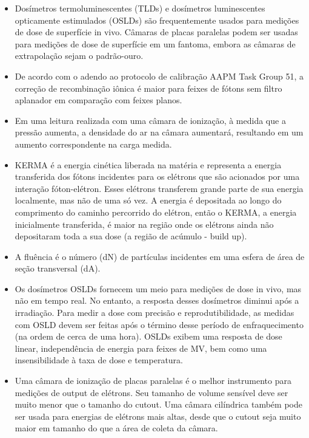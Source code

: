 \documentclass[11pt,a4paper]{article}
\newcounter{exemplo}
\begin{document}
\begin{exemplo}[Dosimetria]
\begin{itemize}
        \item Dosímetros termoluminescentes (TLDs) e dosímetros luminescentes opticamente estimulados (OSLDs) são frequentemente usados para medições de dose de superfície in vivo. Câmaras de placas paralelas podem ser usadas para medições de dose de superfície em um fantoma, embora as câmaras de extrapolação sejam o padrão-ouro.
        
        \item De acordo com o adendo ao protocolo de calibração AAPM Task Group 51, a correção de recombinação iônica é maior para feixes de fótons sem filtro aplanador em comparação com feixes planos.
        
        \item Em uma leitura realizada com uma câmara de ionização, à medida que a pressão aumenta, a densidade do ar na câmara aumentará, resultando em um aumento correspondente na carga medida.
        
        \item KERMA é a energia cinética liberada na matéria e representa a energia transferida dos fótons incidentes para os elétrons que são acionados por uma interação fóton-elétron. Esses elétrons transferem grande parte de sua energia localmente, mas não de uma só vez. A energia é depositada ao longo do comprimento do caminho percorrido do elétron, então o KERMA, a energia inicialmente transferida, é maior na região onde os elétrons ainda não depositaram toda a sua dose (a região de acúmulo - build up).
        
        \item A fluência é o número (dN) de partículas incidentes em uma esfera de área de seção transversal (dA).
        
        \item Os dosímetros OSLDs fornecem um meio para medições de dose in vivo, mas não em tempo real. No entanto, a resposta desses dosímetros diminui após a irradiação. Para medir a dose com precisão e reprodutibilidade, as medidas com  OSLD devem ser feitas após o término desse período de enfraquecimento (na ordem de cerca de uma hora). OSLDs exibem uma resposta de dose linear, independência de energia para feixes de MV, bem como uma insensibilidade à taxa de dose e temperatura.
        
        \item Uma câmara de ionização de placas paralelas é o melhor instrumento para medições de output de elétrons. Seu tamanho de volume sensível deve ser muito menor que o tamanho do cutout. Uma câmara cilíndrica também pode ser usada para energias de elétrons mais altas, desde que o cutout seja muito maior em tamanho do que a área de coleta da câmara.
        

\end{itemize}
\end{exemplo}
\end{document}
